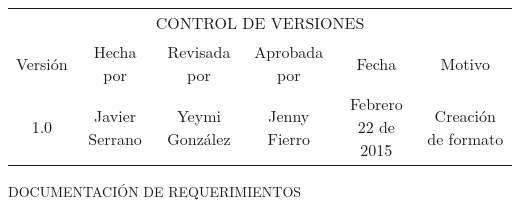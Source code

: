 %
\begin{table}[H]
	\centering
	\begin{tabular}{| c | c | c | c | c | c | }
	\hline
	\multicolumn{6}{c}{CONTROL DE VERSIONES} \\
	\cline{1-6}\noalign{\smallskip}
	\hline
	Versi\'on & Hecha por & Revisada por & Aprobada por & Fecha & Motivo \\ \hline
	 1.0 & Javier Serrano & Yeymi Gonz\'alez & Jenny Fierro & Febrero 22 de 2015 & Creaci\'on de formato \\
	\hline
	\end{tabular}
\end{table}
%
\begin{center}
	\huge{DOCUMENTACI\'ON DE REQUERIMIENTOS}
\end{center}